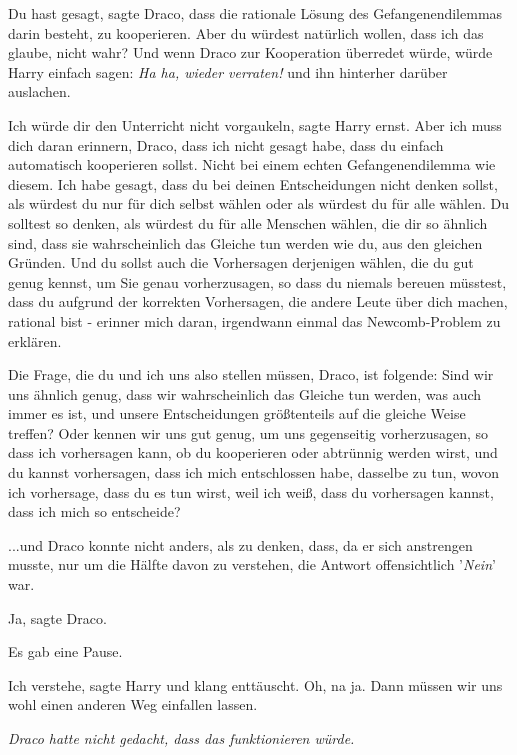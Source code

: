 \glqq{}Du hast gesagt\grqq{}, sagte Draco, \glqq{}dass die rationale Lösung des
Gefangenendilemmas darin besteht, zu kooperieren. Aber du würdest natürlich
wollen, dass ich das glaube, nicht wahr?\grqq{} Und wenn Draco zur Kooperation
überredet würde, würde Harry einfach sagen: \emph{ \glqq{}Ha ha, wieder
verraten!\grqq{}} und ihn hinterher darüber auslachen.

\glqq{}Ich würde dir den Unterricht nicht vorgaukeln\grqq{}, sagte Harry ernst.
\glqq{}Aber ich muss dich daran erinnern, Draco, dass ich nicht gesagt habe, dass
du einfach automatisch kooperieren sollst. Nicht bei einem echten
Gefangenendilemma wie diesem. Ich habe gesagt, dass du bei deinen Entscheidungen
nicht denken sollst, als würdest du nur für dich selbst wählen oder als würdest
du für alle wählen. Du solltest so denken, als würdest du für alle Menschen
wählen, die dir so ähnlich sind, dass sie wahrscheinlich das Gleiche tun werden
wie du, aus den gleichen Gründen. Und du sollst auch die Vorhersagen derjenigen
wählen, die du gut genug kennst, um Sie genau vorherzusagen, so dass du niemals
bereuen müsstest, dass du aufgrund der korrekten Vorhersagen, die andere Leute
über dich machen, rational bist - erinner mich daran, irgendwann einmal das
Newcomb-Problem zu erklären.

Die Frage, die du und ich uns also stellen müssen, Draco, ist folgende: Sind wir
uns ähnlich genug, dass wir wahrscheinlich das Gleiche tun werden, was auch
immer es ist, und unsere Entscheidungen größtenteils auf die gleiche Weise
treffen? Oder kennen wir uns gut genug, um uns gegenseitig vorherzusagen, so
dass ich vorhersagen kann, ob du kooperieren oder abtrünnig werden wirst, und du
kannst vorhersagen, dass ich mich entschlossen habe, dasselbe zu tun, wovon ich
vorhersage, dass du es tun wirst, weil ich weiß, dass du vorhersagen kannst,
dass ich mich so entscheide?\grqq{}

...und Draco konnte nicht anders, als zu denken, dass, da er sich anstrengen
musste, nur um die Hälfte davon zu verstehen, die Antwort offensichtlich
'\emph{Nein}' war.

\glqq{}Ja\grqq{}, sagte Draco.

Es gab eine Pause.

\glqq{}Ich verstehe\grqq{}, sagte Harry und klang enttäuscht. \glqq{}Oh, na ja.
Dann müssen wir uns wohl einen anderen Weg einfallen lassen.\grqq{}

\emph{Draco hatte nicht gedacht, dass das funktionieren würde.}

